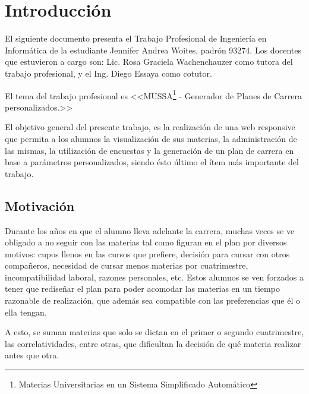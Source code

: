 \documentclass[a4paper]{article}
\begin{document}
  \newpage
  

  \tableofcontents %
    
  \pagestyle{fancy}
  \rhead{}
  \renewcommand{\headrulewidth}{0.4pt} %

  \newpage


\section{Introducción}

El siguiente documento presenta el Trabajo Profesional de Ingeniería en Informática de la estudiante Jennifer Andrea Woites, padrón 93274. Los docentes que estuvieron a cargo son: Lic. Rosa Graciela Wachenchauzer como tutora del trabajo profesional, y el Ing. Diego Essaya como cotutor. \newline

El tema del trabajo profesional es <<MUSSA\footnote{Materias Universitarias en un Sistema Simplificado Automático} - Generador de Planes de Carrera personalizados.>> \newline

El objetivo general del presente trabajo, es la realización de una web responsive que permita a los alumnos la visualización de sus materias, la administración de las mismas, la utilización de encuestas y la generación de un plan de carrera en base a parámetros personalizados, siendo ésto último el ítem más importante del trabajo.

\subsection{Motivación}

Durante los años en que el alumno lleva adelante la carrera, muchas veces se ve obligado a no seguir con las materias tal como figuran en el plan por diversos motivos: cupos llenos en las cursos que prefiere, decisión para cursar con otros compañeros, necesidad de cursar menos materias por cuatrimestre, incompatibilidad laboral, razones personales, etc. Estos alumnos se ven forzados a tener que rediseñar el plan para poder acomodar las materias en un tiempo razonable de realización, que además sea compatible con las preferencias que él o ella tengan.

A esto, se suman materias que solo se dictan en el primer o segundo cuatrimestre, las correlatividades, entre otras, que dificultan la decisión de qué materia realizar antes que otra.
\end{document}
